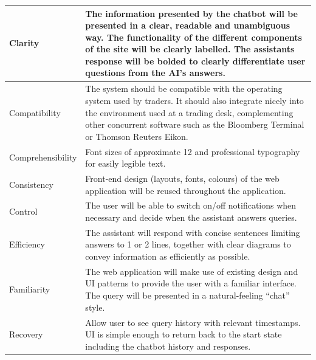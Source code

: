 \documentclass[]{IEEEtran}
\begin{document}
	\begin{table}[h]
	\begin{tabular}{| m{2cm} | m{5.5cm} | }
		\hline
		Clarity & The information presented by the chatbot will be presented in a clear, readable and unambiguous way. The functionality of the different components of the site will be clearly labelled. The assistants response will be bolded to clearly differentiate user questions from the AI’s answers. \\
		
		\hline
		
		Compatibility & The system should be compatible with the operating system used by traders. It should also integrate nicely into the environment used at a trading desk, complementing other concurrent software such as the Bloomberg Terminal or Thomson Reuters Eikon. \\
		
		\hline
		
		Comprehensibility & Font sizes of approximate 12 and professional typography for easily legible text. \\
		
		\hline
		
		Consistency & Front-end design (layouts, fonts, colours) of the web application will be reused throughout the application. \\
		
		\hline
		
		Control & The user will be able to switch on/off notifications when necessary and decide when the assistant answers queries. \\
		
		\hline
		
		Efficiency & The assistant will respond with concise sentences limiting answers to 1 or 2 lines, together with clear diagrams to convey information as efficiently as possible. \\
		
		\hline
		
		Familiarity & The web application will make use of existing design and UI patterns to provide the user with a familiar interface. The query will be presented in a natural-feeling “chat” style. \\
		
		\hline 
		
		Recovery & Allow user to see query history with relevant timestamps. UI is simple enough to return back to the start state including the chatbot history and responses. \\
		

\end{tabular}
\end{table}
\end{document}
